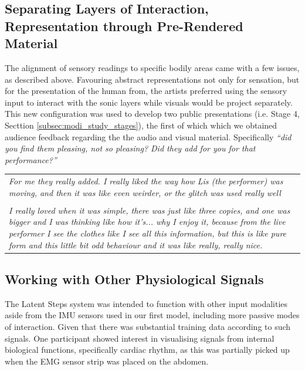 \subsection*{Separating Layers of Interaction, Representation through Pre-Rendered Material}

The alignment of sensory readings to specific bodily areas came with a few issues, as described above. Favouring abstract representations not only for sensation, but for the presentation of the human from, the artists preferred using the sensory input to interact with the sonic layers while visuals would be project separately. This new configuration was used to develop two public presentations (i.e. Stage 4, Secttion \ref{subsec:modi_study_stages}), the first of which which we obtained audience feedback regarding the the audio and visual material. Specifically \textit{``did you find them pleasing, not so pleasing? Did they add for you for that performance?''}

\begin{center}
\begin{tabular}{ p{13cm}}
\textit{For me they really added. I really liked the way how Lis (the performer) was moving, and then it was like even weirder, or the glitch was used really well} \\
\\
\textit{I really loved when it was simple, there was just like three copies, and one was bigger and I was thinking like how it's... why I enjoy it, because from the live performer I see the clothes like I see all this information, but this is like pure form and this little bit odd behaviour and it was like really, really nice.}
\end{tabular}
\end{center}

\subsection*{Working with Other Physiological Signals}

The Latent Steps system was intended to function with other input modalities aside from the IMU sensors used in our first model, including more passive modes of interaction. Given that there was substantial training data according to such signals. One participant showed interest in visualising signals from internal biological functions, specifically cardiac rhythm, as this was partially picked up when the EMG sensor strip was placed on the abdomen.


